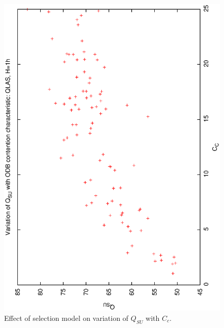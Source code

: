 \begin{figure}[h]
 \label{fig:qsucc_ql1}
\begin{center}
 \includegraphics[scale=0.5, angle=-90]{figures/qsucc_ql1.eps}
 \caption[Effect of selection model on variation of $Q_{SU}$ with $C_c$.] 
   {Effect of selection model on variation of $Q_{SU}$ with $C_c$.}
\end{center}
\end{figure}

